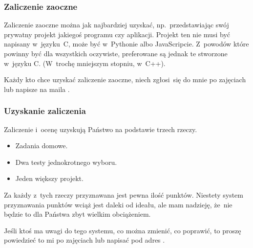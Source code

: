 \documentclass[10pt,t]{beamer}
\begin{document}
\begin{frame}
  \frametitle{Zaliczenie zaoczne}


  Zaliczenie zaoczne można jak najbardziej uzyskać, np.~przedstawiając
  swój prywatny projekt jakiegoś programu czy aplikacji. Projekt ten
  \alert{nie musi} być napisany w~języku~C, może być w~Pythonie albo
  JavaScripcie. Z~powodów które powinny być dla wszystkich oczywiste,
  preferowane są jednak te stworzone w~języku C. (W~trochę mniejszym
  stopniu, w~C++).

  Każdy kto chce uzyskać zaliczenie zaoczne, niech zgłosi~się do mnie po
  zajęciach lub napisze na maila \email.

\end{frame}





\begin{frame}
  \frametitle{Uzyskanie zaliczenia}


  Zaliczenie i~ocenę uzyskują Państwo na podstawie trzech rzeczy.

  \begin{itemize}

  \item Zadania domowe.

  \item Dwa testy jednokrotnego wyboru.

  \item Jeden większy projekt.

  \end{itemize}

  Za każdy z~tych rzeczy przyznawana jest pewna ilość punktów. Niestety
  system przyznawania punktów wciąż jest daleki od ideału, ale mam nadzieję,
  że~nie będzie to dla Państwa zbyt wielkim obciążeniem.

  Jeśli ktoś ma uwagi do tego systemu, co można zmienić, co poprawić, to
  proszę powiedzieć to mi po zajęciach lub napisać pod adres \email.

\end{frame}
\end{document}
